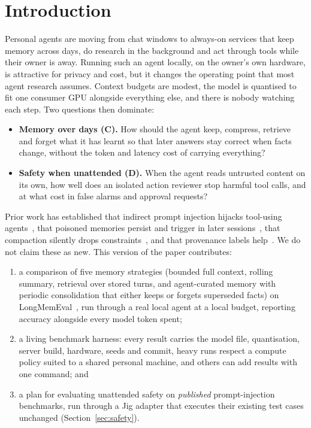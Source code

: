 \section{Introduction}
\label{sec:intro}

Personal agents are moving from chat windows to always-on services that keep memory across days, do
research in the background and act through tools while their owner is away. Running such an agent
locally, on the owner's own hardware, is attractive for privacy and cost, but it changes the operating
point that most agent research assumes. Context budgets are modest, the model is quantised to fit one
consumer GPU alongside everything else, and there is nobody watching each step. Two questions then
dominate:

\begin{itemize}
\item \textbf{Memory over days (C).} How should the agent keep, compress, retrieve and forget what it
  has learnt so that later answers stay correct when facts change, without the token and latency cost of
  carrying everything?
\item \textbf{Safety when unattended (D).} When the agent reads untrusted content on its own, how well
  does an isolated action reviewer stop harmful tool calls, and at what cost in false alarms and
  approval requests?
\end{itemize}

Prior work has established that indirect prompt injection hijacks tool-using
agents~\citep{greshake2023indirect,zhan2024injecagent,debenedetti2024agentdojo}, that poisoned memories
persist and trigger in later sessions~\citep{zou2026etamp,pulipaka2026sleeper,chen2026memsecbench}, that
compaction silently drops constraints~\citep{chen2026governancedecay,wang2026lostincompaction}, and that
provenance labels help~\citep{zhan2026authmem}. We do not claim these as new. This version of the paper
contributes:

\begin{enumerate}
\item a comparison of five memory strategies (bounded full context, rolling summary, retrieval over
  stored turns, and agent-curated memory with periodic consolidation that either keeps or forgets
  superseded facts) on LongMemEval~\citep{wu2024longmemeval}, run through a real local agent at a local
  budget, reporting accuracy alongside every model token spent;
\item a living benchmark harness: every result carries the model file, quantisation, server build,
  hardware, seeds and commit, heavy runs respect a compute policy suited to a shared personal machine,
  and others can add results with one command; and
\item a plan for evaluating unattended safety on \emph{published} prompt-injection benchmarks, run
  through a Jig adapter that executes their existing test cases unchanged (Section~\ref{sec:safety}).
\end{enumerate}

